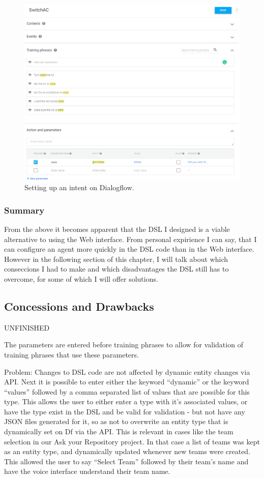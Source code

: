 \begin{figure}[ht]
    \centering
    \includegraphics[width=1\textwidth]{Thesis Images/CreateIntent.PNG}
    \caption{Setting up an intent on Dialogflow.}
        \label{CreateIntent}
\end{figure}

\subsubsection{Summary}
From the above it becomes apparent that the DSL I designed is a viable alternative to using the Web interface.
From personal expirience I can say, that I can configure an agent more quickly in the DSL code than in the Web interface. However in the following section of this chapter, I will talk about which conseccions I had to make and which disadvantages the DSL still has to overcome, for some of which I will offer solutions.

\subsection{Concessions and Drawbacks}
UNFINISHED

The parameters are entered before training phrases to allow for validation of training phrases that use these parameters.

Problem: Changes to DSL code are not affected by dynamic entity changes via API.
Next it is possible to enter either the keyword “dynamic” or the keyword “values” followed by a comma separated list of values that are possible for this type.
This allows the user to either enter a type with it’s associated values, or have the type exist in the DSL and be valid for validation - but not have any JSON files generated for it, so as not to overwrite an entity type that is dynamically set on Df via the API.
This is relevant in cases like the team selection in our Ask your Repository project.
In that case a list of teams was kept as an entity type, and dynamically updated whenever new teams were created. This allowed the user to say “Select Team” followed by their team’s name and have the voice interface understand their team name.

